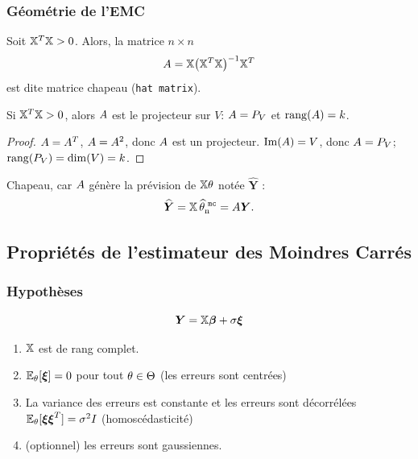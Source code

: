 \begin{frame} \frametitle{Géométrie de l'EMC}
Soit $\mathbb{X}^T\mathbb{X}>0$. Alors, la matrice $n\times n$
$$
A = \mathbb{X}\big(\mathbb{X}^T\mathbb{X}\big)^{-1}\mathbb{X}^T
$$
est dite \alert{matrice chapeau} (\texttt{hat matrix}).
%
\begin{prop}
Si $\mathbb{X}^T\mathbb{X}>0$, alors $A$ est le projecteur sur
$V$: \alert{$A=P_V$} et \alert{${\rm rang}(A)=k$}.
\end{prop}
{\begin{proof}
  $A=A^T$, $A=A^2$, donc $A$ est un
projecteur. ${\rm Im}(A) = V$, donc $A=P_V$; \
${\rm rang}(P_V)={\rm dim}(V)=k$.
\end{proof}}
{\alert{Chapeau}, car $A$ génère la prévision de
$\mathbb{X}\theta$ notée $\widehat{\boldsymbol{Y}}$ :
$$\widehat{\boldsymbol{Y}}= \mathbb{X}\operatorname{\widehat \theta_n^{\,\,{\tt mc}}}= A\boldsymbol{Y}.$$
}
\end{frame}



\subsection{Propriétés de l'estimateur des Moindres Carrés}

\begin{frame}
\frametitle{Hypothèses}
\[
\operatorname{\boldsymbol{Y}}= \mathbb{X} \boldsymbol{\beta} + \sigma \boldsymbol{\xi}
\]
\begin{enumerate}
\item \alert<1>{$\mathbb{X}$ est de rang complet.}
\item \alert<2>{$\operatorname{{\mathbb E}}_\theta[\boldsymbol{\xi}]= 0$ pour tout $\theta \in \Theta$  (les erreurs sont centrées)}
\item \alert<3>{La variance des erreurs est constante et les erreurs sont décorrélées $\operatorname{{\mathbb E}}_{\theta}[\boldsymbol{\xi} \boldsymbol{\xi}^T] = \sigma^2 I$ (homoscédasticité)}
\item \alert<4>{(optionnel) les erreurs sont gaussiennes.}
\end{enumerate}
\end{frame}

